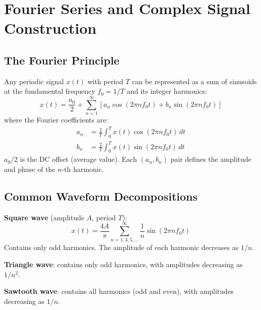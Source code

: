 \documentclass[11pt,letterpaper,twoside,openany]{book}
\begin{document}
\chapter{Fourier Series and Complex Signal Construction}
\label{ch:fourier}

\section{The Fourier Principle}
Any periodic signal $x(t)$ with period $T$ can be represented as a sum of sinusoids at the fundamental frequency $f_0 = 1/T$ and its integer harmonics:
\begin{equation}
x(t) = \frac{a_0}{2} + \sum_{n=1}^{\infty} \left[ a_n \cos(2\pi n f_0 t) + b_n \sin(2\pi n f_0 t) \right]
\end{equation}
where the Fourier coefficients are:
\begin{align}
a_n &= \frac{2}{T} \int_0^T x(t) \cos(2\pi n f_0 t)\, dt \\
b_n &= \frac{2}{T} \int_0^T x(t) \sin(2\pi n f_0 t)\, dt
\end{align}
$a_0/2$ is the DC offset (average value). Each $(a_n, b_n)$ pair defines the amplitude and phase of the $n$-th harmonic.

\section{Common Waveform Decompositions}
\textbf{Square wave} (amplitude $A$, period $T$):
\begin{equation}
x(t) = \frac{4A}{\pi} \sum_{n=1,3,5,\ldots}^{\infty} \frac{1}{n} \sin(2\pi n f_0 t)
\end{equation}
Contains only odd harmonics. The amplitude of each harmonic decreases as $1/n$.

\textbf{Triangle wave}: contains only odd harmonics, with amplitudes decreasing as $1/n^2$.

\textbf{Sawtooth wave}: contains all harmonics (odd and even), with amplitudes decreasing as $1/n$.
\end{document}

